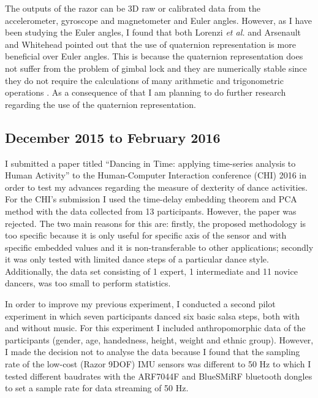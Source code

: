 \documentclass[9pt,journal,onecolumn,compsoc]{IEEEtran}
\begin{document}
The outputs of the razor can be 3D raw or calibrated data from the accelerometer,
gyroscope and magnetometer and Euler angles.
However, as I have been studying the Euler angles, I found that both Lorenzi \textit{et al.} 
and Arsenault and Whitehead pointed out that the use of quaternion representation is more beneficial over Euler angles.
This is because the quaternion representation does not suffer from the problem of gimbal lock
and they are numerically stable since they do not require the calculations of 
many arithmetic and trigonometric operations \cite{Lorenzi2015, Arsenault2015_a, Munkundan2002}.
As a consequence of that I am planning to do further research regarding the use of the quaternion representation.




\subsection{December 2015 to February 2016}

I submitted a paper titled ``Dancing in Time: applying time-series analysis to Human Activity''
to the Human-Computer Interaction conference (CHI) 2016 in order to test my advances regarding the measure of dexterity 
of dance activities. For the CHI's submission I used the time-delay embedding theorem and PCA method
with the data collected from 13 participants. 
However, the paper was rejected.
The two main reasons for this are:
firstly, the proposed methodology is too specific 
because it is only useful for specific axis of the sensor and with specific embedded values 
and it is non-transferable to other applications;
secondly it was only tested with limited dance steps of a particular dance style.
Additionally, the data set consisting of 1 expert, 
1 intermediate and 11 novice dancers, was too small to perform statistics.

In order to improve my previous experiment,
I conducted a second pilot experiment in which seven participants danced 
six basic salsa steps, both with and without music.
For this experiment I included anthropomorphic data of the participants 
(gender, age, handedness, height, weight and ethnic group).
However,
I made the decision not to analyse the data because I found that the
sampling rate of the low-cost (Razor 9DOF) IMU sensors was different to 50 Hz
to which I tested different baudrates with the ARF7044F and BlueSMiRF bluetooth dongles 
to set a sample rate for data streaming of 50 Hz.
\end{document}
